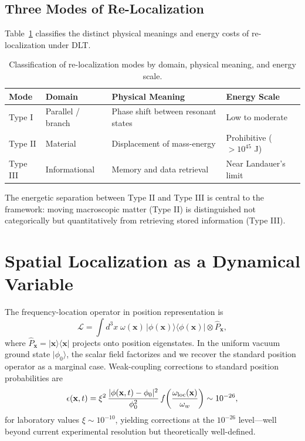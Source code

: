\documentclass[conference,letterpaper,10pt]{IEEEtran}
\begin{document}
\subsection{Three Modes of Re-Localization}
Table~\ref{tab:modes} classifies the distinct physical meanings and energy costs of re-localization under DLT.
\begin{table}[t]
\centering
\small
\caption{Classification of re-localization modes by domain, physical meaning, and energy scale.}
\label{tab:modes}
\begin{tabular}{@{}p{1.5cm} p{2.0cm} p{6.5cm} p{4.0cm}@{}}
\toprule
\textbf{Mode} & \textbf{Domain} & \textbf{Physical Meaning} & \textbf{Energy Scale} \\
\midrule
Type I & Parallel / branch & Phase shift between resonant states & Low to moderate \\
Type II & Material & Displacement of mass-energy & Prohibitive (\(>10^{45}\) J) \\
Type III & Informational & Memory and data retrieval & Near Landauer's limit \\
\bottomrule
\end{tabular}
\end{table}
The energetic separation between Type II and Type III is central to the framework: moving macroscopic matter (Type II)
 is distinguished not categorically but quantitatively from retrieving stored information (Type III).

\section{Spatial Localization as a Dynamical Variable}
The frequency-location operator in position representation is
\begin{equation}
\mathcal{L} = \int d^3x\;\omega(\mathbf{x})\,|\phi(\mathbf{x})\rangle\langle\phi(\mathbf{x})| \otimes
\hat{P}_{\mathbf{x}},
\label{eq:spatial-op}
\end{equation}
where \(\hat{P}_{\mathbf{x}} = |\mathbf{x}\rangle\langle\mathbf{x}|\) projects onto position eigenstates. In the uniform
 vacuum ground state \(|\phi_0\rangle\), the scalar field factorizes and we recover the standard position operator as a
marginal case.
Weak-coupling corrections to standard position probabilities are
\begin{equation}
\epsilon(\mathbf{x},t) = \xi^2\,\frac{|\phi(\mathbf{x},t)-\phi_0|^2}{\phi_0^2}\,
f\!\left(\frac{\omega_{\rm loc}(\mathbf{x})}{\omega_w}\right) \sim 10^{-26},
\label{eq:epsilon}
\end{equation}
for laboratory values \(\xi \sim 10^{-10}\), yielding corrections at the \(10^{-26}\) level---well beyond current
experimental resolution but theoretically well-defined.
\end{document}
